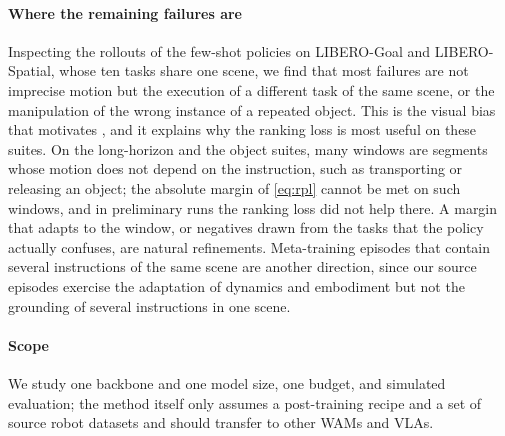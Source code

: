 \paragraph{Where the remaining failures are}
Inspecting the rollouts of the few-shot policies on LIBERO-Goal and LIBERO-Spatial, whose ten tasks share one scene, we find that most failures are not imprecise motion but the execution of a different task of the same scene, or the manipulation of the wrong instance of a repeated object.
This is the visual bias that motivates \RPL, and it explains why the ranking loss is most useful on these suites.
On the long-horizon and the object suites, many windows are segments whose motion does not depend on the instruction, such as transporting or releasing an object; the absolute margin of \cref{eq:rpl} cannot be met on such windows, and in preliminary runs the ranking loss did not help there.
A margin that adapts to the window, or negatives drawn from the tasks that the policy actually confuses, are natural refinements.
Meta-training episodes that contain several instructions of the same scene are another direction, since our source episodes exercise the adaptation of dynamics and embodiment but not the grounding of several instructions in one scene.

\paragraph{Scope}
We study one backbone and one model size, one \method budget, and simulated evaluation; the method itself only assumes a post-training recipe and a set of source robot datasets and should transfer to other WAMs and VLAs.
